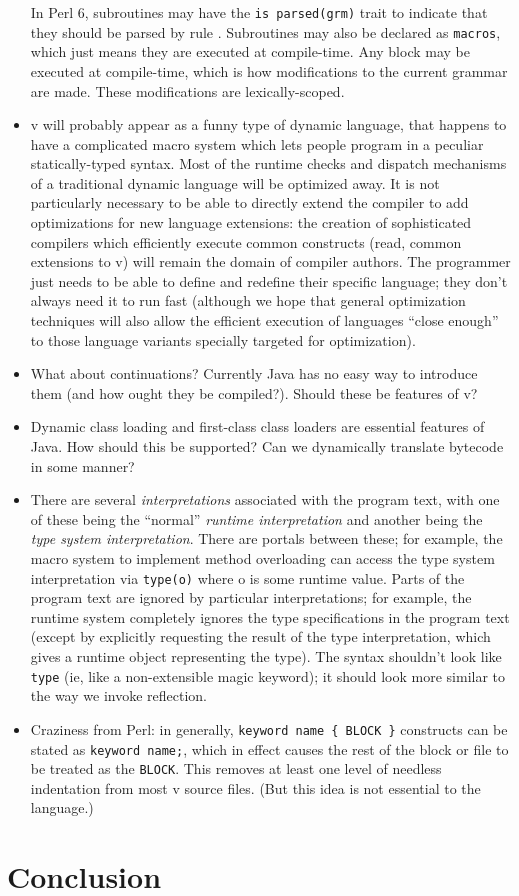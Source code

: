 \documentclass[11pt,notitlepage,twocolumn]{article}
\newcommand{\vlang}{\textsf{v}\xspace}
\begin{document}
\begin{itemize}
  In Perl 6, subroutines may have the \texttt{is parsed(grm)} trait to
  indicate that they should be parsed by rule .
  Subroutines may also be declared as \texttt{macros}, which just
  means they are executed at compile-time.  Any block may be executed
  at compile-time, which is how modifications to the current grammar
  are made.  These modifications are lexically-scoped.
\item \vlang will probably appear as a funny type of dynamic language,
  that happens to have a complicated macro system which lets people
  program in a peculiar statically-typed syntax.  Most of the
  runtime checks and dispatch mechanisms of a traditional dynamic
  language will be optimized away.  It is not particularly
  necessary to be able to directly extend the compiler to add
  optimizations for new language extensions: the creation of
  sophisticated compilers which efficiently execute common constructs
  (read, common extensions to \vlang) will remain the domain of compiler
  authors.   The programmer just needs to be able to define and
  redefine their specific language; they don't always need it to run
  fast (although we hope that general optimization techniques will
  also allow the efficient execution of languages ``close enough'' to
  those language variants specially targeted for optimization).
\item What about continuations?  Currently Java has no easy way to
  introduce them (and how ought they be compiled?).  Should these be
  features of \vlang?
\item Dynamic class loading and first-class class loaders are
  essential features of Java.  How should this be supported?  Can we
  dynamically translate bytecode in some manner?
\item There are several \emph{interpretations} associated with the
  program text, with one of these being the ``normal'' \emph{runtime
  interpretation} and another being the \emph{type system
  interpretation}.  There are portals between these; for example, the
  macro system to implement method overloading can access the type
  system interpretation via \texttt{type(o)} where o is some runtime
  value.  Parts of the program text are ignored by particular
  interpretations; for example, the runtime system completely ignores
  the type specifications in the program text (except by explicitly
  requesting the result of the type interpretation, which gives
  a runtime object representing the type).  The syntax shouldn't look
  like \texttt{type} (ie, like a non-extensible magic keyword); it
  should look more similar to the way we invoke reflection.
\item Craziness from Perl: in generally, \texttt{keyword name \{ BLOCK \}}
  constructs can be stated as \texttt{keyword name;}, which in effect
  causes the rest of the block or file to be treated as the \texttt{BLOCK}.
  This removes at least one level of needless indentation from most
  \vlang source files. (But this idea is not essential to the language.)
\end{itemize}

\section{Conclusion}


\end{document}
